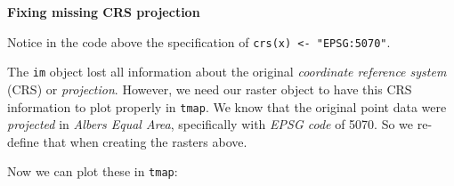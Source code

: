 \documentclass[
]{book}
\newenvironment{Shaded}{\begin{snugshade}}{\end{snugshade}}
\newcommand{\FunctionTok}[1]{\textcolor[rgb]{0.00,0.00,0.00}{#1}}
\newcommand{\NormalTok}[1]{#1}
\newcommand{\OtherTok}[1]{\textcolor[rgb]{0.56,0.35,0.01}{#1}}
\newcommand{\SpecialCharTok}[1]{\textcolor[rgb]{0.00,0.00,0.00}{#1}}
\newcommand{\StringTok}[1]{\textcolor[rgb]{0.31,0.60,0.02}{#1}}
\newenvironment{rmdtip}[1]
  {
  \begin{itemize}
  \renewcommand{\labelitemi}{
    \raisebox{-.7\height}[0pt][0pt]{
      {\setkeys{Gin}{width=3em,keepaspectratio}\texttt{[image: images/\#1]}}
    }
  }
  \setlength{\fboxsep}{1em}
  \begin{tip}
  \item
  }
  {
  \end{tip}
  \end{itemize}
  }
\begin{document}
\begin{Shaded}
\end{Shaded}

\begin{rmdtip}{tip}
\textbf{Fixing missing CRS projection}

Notice in the code above the specification of \texttt{crs(x)\ \textless{}-\ "EPSG:5070"}.

The \texttt{im} object lost all information about the original \emph{coordinate reference system} (CRS) or \emph{projection}. However, we need our raster object to have this CRS information to plot properly in \texttt{tmap}. We know that the original point data were \emph{projected} in \emph{Albers Equal Area}, specifically with \emph{EPSG code} of 5070. So we re-define that when creating the rasters above.

\end{rmdtip}

Now we can plot these in \texttt{tmap}:
\end{document}
